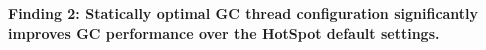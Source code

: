 \textbf{Finding 2: 
Statically optimal GC thread configuration significantly improves GC performance over the HotSpot default settings.
}